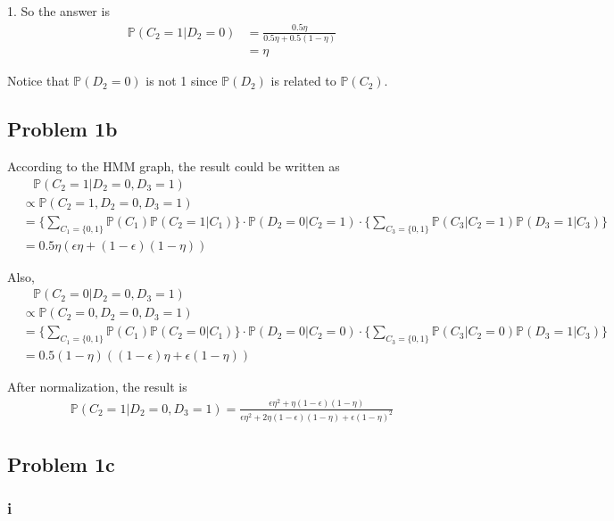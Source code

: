 \documentclass[paper=a4, fontsize=10pt]{scrartcl} %
\numberwithin{equation}{section} %
\numberwithin{figure}{section} %
\numberwithin{table}{section} %
\begin{document}
\begin{spacing}{1.}
So the answer is
\begin{displaymath}
\begin{aligned}
\mathbb{P}(C_{2}=1|D_{2}=0) &= \frac{0.5 \eta}{0.5 \eta + 0.5 (1 - \eta)}\\
&= \eta
\end{aligned}
\end{displaymath}

Notice that $\mathbb{P}(D_{2}=0)$ is not 1 since $\mathbb{P}(D_{2})$ is related to $\mathbb{P}(C_{2})$.

\subsection{Problem 1b}
According to the HMM graph, the result could be written as
\begin{displaymath}
\begin{aligned}
&\ \ \ \ \mathbb{P}(C_{2}=1|D_{2}=0, D_{3}=1) \\
&\propto  \mathbb{P}(C_{2}=1, D_{2}=0, D_{3}=1)\\
&=\{\sum_{C_{1} = \{0, 1\}}\mathbb{P}(C_{1})\mathbb{P}(C_{2} = 1|C_{1})\} \cdot \mathbb{P}(D_{2}=0|C_{2}=1) \cdot \{\sum_{C_{3} = \{0, 1\}}\mathbb{P}(C_{3}|C_{2}=1)\mathbb{P}(D_{3}=1|C_{3})\}\\
& = 0.5\eta(\epsilon\eta+(1-\epsilon)(1-\eta))
\end{aligned}
\end{displaymath}

Also,
\begin{displaymath}
\begin{aligned}
&\ \ \ \ \mathbb{P}(C_{2}=0|D_{2}=0, D_{3}=1) \\
&\propto  \mathbb{P}(C_{2}=0, D_{2}=0, D_{3}=1)\\
&=\{\sum_{C_{1} = \{0, 1\}}\mathbb{P}(C_{1})\mathbb{P}(C_{2} = 0|C_{1})\} \cdot \mathbb{P}(D_{2}=0|C_{2}=0) \cdot \{\sum_{C_{3} = \{0, 1\}}\mathbb{P}(C_{3}|C_{2}=0)\mathbb{P}(D_{3}=1|C_{3})\}\\
& = 0.5(1-\eta)((1-\epsilon)\eta+\epsilon(1-\eta))
\end{aligned}
\end{displaymath}

After normalization, the result is 
\begin{displaymath}
\begin{aligned}
\mathbb{P}(C_{2}=1|D_{2}=0, D_{3}=1) = \frac{\epsilon\eta^{2} + \eta(1-\epsilon)(1-\eta)}{\epsilon\eta^{2} + 2\eta(1-\epsilon)(1-\eta) + \epsilon(1-\eta)^{2}}
\end{aligned}
\end{displaymath}

\subsection{Problem 1c}
\subsubsection{i}










\end{spacing}
\end{document}
